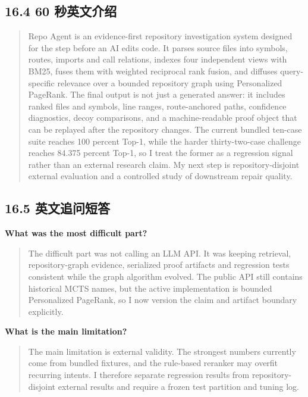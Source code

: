 \documentclass[UTF8,12pt,openany]{ctexbook}
\begin{document}
\subsection{16.4 60 秒英文介绍}

\begin{quote}
Repo Agent is an evidence-first repository investigation system designed for the step before an AI edits code. It parses source files into symbols, routes, imports and call relations, indexes four independent views with BM25, fuses them with weighted reciprocal rank fusion, and diffuses query-specific relevance over a bounded repository graph using Personalized PageRank. The final output is not just a generated answer: it includes ranked files and symbols, line ranges, route-anchored paths, confidence diagnostics, decoy comparisons, and a machine-readable proof object that can be replayed after the repository changes. The current bundled ten-case suite reaches 100 percent Top-1, while the harder thirty-two-case challenge reaches 84.375 percent Top-1, so I treat the former as a regression signal rather than an external research claim. My next step is repository-disjoint external evaluation and a controlled study of downstream repair quality.
\end{quote}

\subsection{16.5 英文追问短答}

\textbf{What was the most difficult part?}\par

\begin{quote}
The difficult part was not calling an LLM API. It was keeping retrieval, repository-graph evidence, serialized proof artifacts and regression tests consistent while the graph algorithm evolved. The public API still contains historical MCTS names, but the active implementation is bounded Personalized PageRank, so I now version the claim and artifact boundary explicitly.
\end{quote}

\textbf{What is the main limitation?}\par

\begin{quote}
The main limitation is external validity. The strongest numbers currently come from bundled fixtures, and the rule-based reranker may overfit recurring intents. I therefore separate regression results from repository-disjoint external results and require a frozen test partition and tuning log.
\end{quote}
\end{document}
